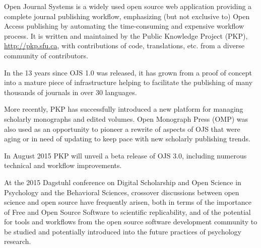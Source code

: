 \documentclass[a4paper,USenglish]{dagrep}
\begin{document}
{}
\license
Open Journal Systems is a widely used open source web application providing a
complete journal publishing workflow, emphasizing (but not exclusive to) Open
Access publishing by automating the time-consuming and expensive workflow
process. It is written and maintained by the Public Knowledge Project (PKP),
\url{http://pkp.sfu.ca}, with contributions of code, translations, etc. from a
diverse community of contributors.

In the 13 years since OJS 1.0 was released, it has grown from a proof of concept
into a mature piece of infrastructure helping to facilitate the publishing of
many thousands of journals in over 30 languages.

More recently, PKP has successfully introduced a new platform for managing
scholarly monographs and edited volumes. Open Monograph Press (OMP) was also
used as an opportunity to pioneer a rewrite of aspects of OJS that were aging or
in need of updating to keep pace with new scholarly publishing trends.

In August 2015 PKP will unveil a beta release of OJS 3.0, including numerous
technical and workflow improvements.

At the 2015 Dagstuhl conference on Digital Scholarship and Open Science in
Psychology and the Behavioral Sciences, crossover discussions between open
science and open source have frequently arisen, both in terms of the importance
of Free and Open Source Software to scientific replicability, and of the
potential for tools and workflows from the open source software development
community to be studied and potentially introduced into the future practices of
psychology research.
\end{document}
